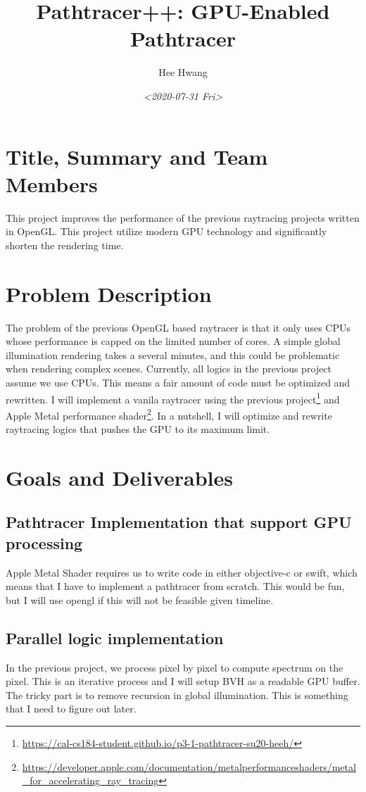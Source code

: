 \documentclass[11pt]{article}
\author{Hee Hwang}
\date{\textit{<2020-07-31 Fri>}}
\title{Pathtracer++: GPU-Enabled Pathtracer}
\begin{document}
\maketitle
\setcounter{tocdepth}{2}
\tableofcontents


\section*{Title, Summary and Team Members}
\label{sec:orgfdb4ca8}
This project improves the performance of the previous raytracing
projects written in OpenGL. This project utilize modern GPU
technology and significantly shorten the rendering time. 

\section*{Problem Description}
\label{sec:org92befbd}
The problem of the previous OpenGL based raytracer is that it only
uses CPUs whose performance is capped on the limited number of
cores.  A simple global illumination rendering takes a several
minutes, and this could be problematic when rendering complex
scenes.  Currently, all logics in the previous project assume we use
CPUs. This means a fair amount of code must be optimized and
rewritten. I will implement a vanila raytracer using the previous
project\footnote{\url{https://cal-cs184-student.github.io/p3-1-pathtracer-su20-heeh/}} and Apple Metal performance shader\footnote{\url{https://developer.apple.com/documentation/metalperformanceshaders/metal\_for\_accelerating\_ray\_tracing}}. In a
nutshell, I will optimize and rewrite raytracing logics that pushes
the GPU to its maximum limit.

\section*{Goals and Deliverables}
\label{sec:orgc556aae}
\subsection*{Pathtracer Implementation that support GPU processing}
\label{sec:orgc70b674}
Apple Metal Shader requires us to write code in either objective-c
or swift, which means that I have to implement a pathtracer from
scratch.  This would be fun, but I will use opengl if this will not
be feasible given timeline.

\subsection*{Parallel logic implementation}
\label{sec:orgf942f08}
In the previous project, we process pixel by pixel to compute
spectrum on the pixel.  This is an iterative process and I will
setup BVH as a readable GPU buffer.  The tricky part is to remove
recursion in global illumination. This is something that I need to
figure out later.
\end{document}
